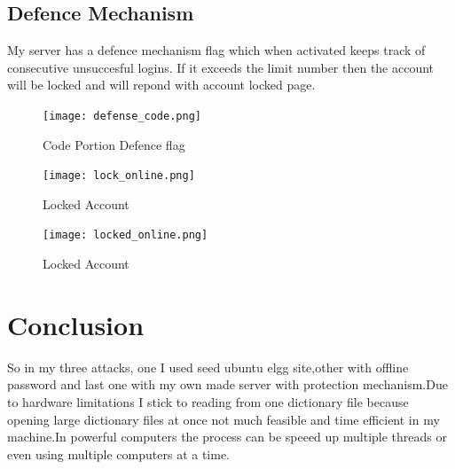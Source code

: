 \documentclass[11pt, english]{article}
\begin{document}
\subsection{Defence Mechanism}
My server has a defence mechanism flag which when activated keeps track of consecutive unsuccesful logins. If it exceeds the limit number then the account will be locked and will repond with account locked page.\\
\newpage
\begin{figure}[h!]
        \begin{minipage}[b]{1\linewidth}
        \centering
        \texttt{[image: defense\_code.png]} \label{Defence Flag}
        \caption{Code Portion Defence flag}
        \end{minipage}
\end{figure}
\newpage
\begin{figure}[h!]
        \begin{minipage}[b]{1\linewidth}
        \centering
        \texttt{[image: lock\_online.png]} \label{Locked page}
        \caption{Locked Account}
        \end{minipage}
\end{figure}
\begin{figure}[h!]
        \begin{minipage}[b]{1\linewidth}
        \centering
        \texttt{[image: locked\_online.png]} \label{locked account}
        \caption{Locked Account}
        \end{minipage}
\end{figure}
\section{Conclusion}
So in my three attacks, one I used seed ubuntu elgg site,other with offline password and last one with my own made server with protection mechanism.Due to hardware limitations I stick to reading from one dictionary file because opening large dictionary files at once not much feasible and time efficient in my machine.In powerful computers the process can be speeed up multiple threads or even using multiple computers at a time. 

\end{document}
